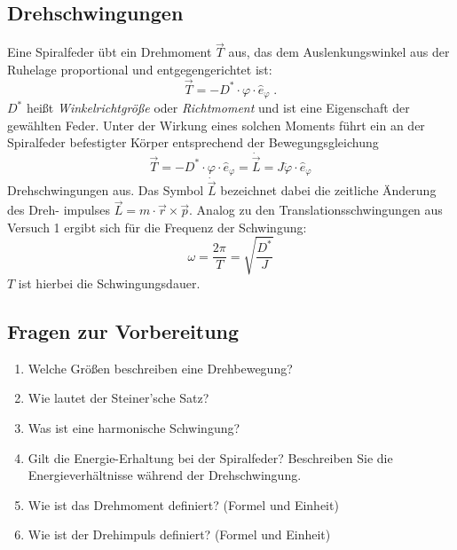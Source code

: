 \subsection{Drehschwingungen}

Eine Spiralfeder übt ein Drehmoment $\vec{T}$ aus, das dem Auslenkungswinkel aus der Ruhelage proportional und entgegengerichtet ist:
\begin{equation}
 \vec{T} = -D^*\cdot\varphi\cdot \hat{e}_{\varphi} \; .
\end{equation}
$D^*$ heißt \textit{Winkelrichtgröße} oder \textit{Richtmoment} und ist eine Eigenschaft der gewählten Feder. Unter der Wirkung eines solchen Moments führt ein an der Spiralfeder befestigter Körper entsprechend der Bewegungsgleichung
\begin{equation}
 \vec{T} = -D^*\cdot\varphi\cdot \hat{e}_{\varphi} = \dot{\vec{L}} = J\ddot{\varphi}\cdot\hat{e}_{\varphi}
\end{equation}
Drehschwingungen aus. Das Symbol $\dot{\vec{L}}$ bezeichnet dabei die zeitliche Änderung des Dreh- impulses $\vec{L} = m\cdot \vec{r}\times\vec{p}$. Analog zu den Translationsschwingungen aus Versuch 1 ergibt sich für die Frequenz der Schwingung:
\begin{equation}
 \omega = \frac{2\pi}{T} = \sqrt{\frac{D^*}{J}}
\end{equation}
$T$ ist hierbei die Schwingungsdauer.

\begin{tutorhint}
\section{Fragen zur Vorbereitung}

\begin{enumerate} 
 \item Welche Größen beschreiben eine Drehbewegung?
 \item Wie lautet der Steiner'sche Satz?
 \item Was ist eine harmonische Schwingung?
 \item Gilt die Energie-Erhaltung bei der Spiralfeder? Beschreiben Sie die Energieverhältnisse während der Drehschwingung.
 \item Wie ist das Drehmoment definiert? (Formel und Einheit)
 \item Wie ist der Drehimpuls definiert? (Formel und Einheit)
\end{enumerate} 
\end{tutorhint}

